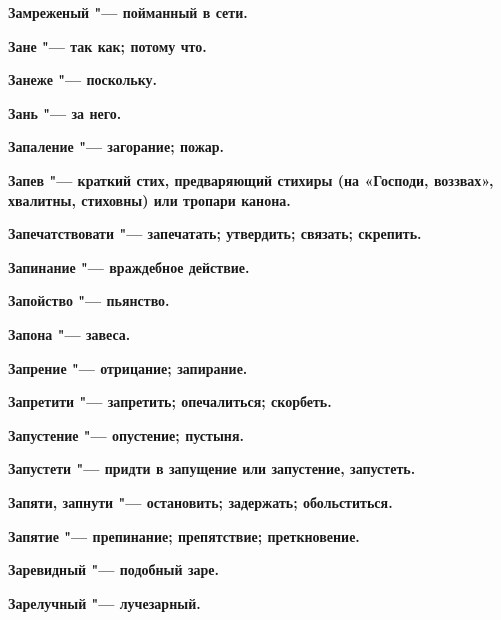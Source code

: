 \begin{mymulticols}{2}
\bfseries Замреженый\normalfont{} "--- пойманный в сети. 




\bfseries Зане\normalfont{} "--- так как; потому что. 




\bfseries Занеже\normalfont{} "--- поскольку. 




\bfseries Зань\normalfont{} "--- за него. 




\bfseries Запаление\normalfont{} "--- загорание; пожар. 




\bfseries Запев\normalfont{} "--- краткий стих, предваряющий стихиры (на «Господи, воззвах», хвалитны, стиховны) или тропари канона. 




\bfseries Запечатствовати\normalfont{} "--- запечатать; утвердить; связать; скрепить. 




\bfseries Запинание\normalfont{} "--- враждебное действие. 




\bfseries Запойство\normalfont{} "--- пьянство. 




\bfseries Запона\normalfont{} "--- завеса. 




\bfseries Запрение\normalfont{} "--- отрицание; запирание. 




\bfseries Запретити\normalfont{} "--- запретить; опечалиться; скорбеть. 




\bfseries Запустение\normalfont{} "--- опустение; пустыня. 




\bfseries Запустети\normalfont{} "--- придти в запущение или запустение, запустеть. 




\bfseries Запяти, запнути\normalfont{} "--- остановить; задержать; обольститься. 




\bfseries Запятие\normalfont{} "--- препинание; препятствие; преткновение. 




\bfseries Заревидный\normalfont{} "--- подобный заре. 




\bfseries Зарелучный\normalfont{} "--- лучезарный. 





\end{mymulticols}
